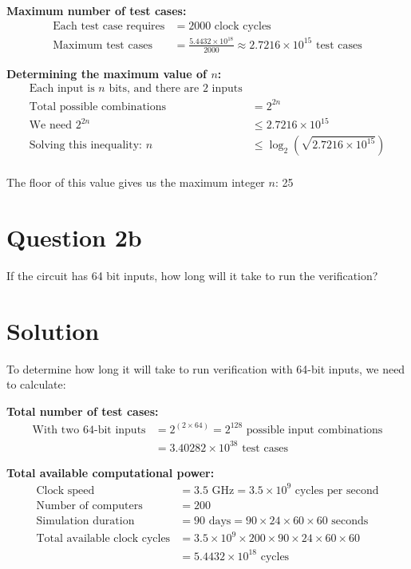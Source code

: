 \documentclass{article}
\begin{document}
\textbf{Maximum number of test cases:}
\begin{align*}
\text{Each test case requires} &= 2000 \text{ clock cycles} \\
\text{Maximum test cases} &= \frac{5.4432 \times 10^{18}}{2000} \approx 2.7216 \times 10^{15} \text{ test cases}
\end{align*}

\textbf{Determining the maximum value of $n$:}
\begin{align*}
\text{Each input is $n$ bits, and there are 2 inputs} \\
\text{Total possible combinations} &= 2^{2n} \\
\text{We need } 2^{2n} &\leq 2.7216 \times 10^{15} \\
\text{Solving this inequality: } n &\leq \log_2(\sqrt{2.7216 \times 10^{15}}) \\
\end{align*}

The floor of this value gives us the maximum integer $n$: 25

\section*{Question 2b}

If the circuit has 64 bit inputs, how long will it take to run the verification?

\section*{Solution}

To determine how long it will take to run verification with 64-bit inputs, we need to calculate:

\textbf{Total number of test cases:}
\begin{align*}
\text{With two 64-bit inputs} &= 2^{(2 \times 64)} = 2^{128} \text{ possible input combinations} \\
&= 3.40282 \times 10^{38} \text{ test cases}
\end{align*}

\textbf{Total available computational power:}
\begin{align*}
\text{Clock speed} &= 3.5 \text{ GHz} = 3.5 \times 10^9 \text{ cycles per second} \\
\text{Number of computers} &= 200 \\
\text{Simulation duration} &= 90 \text{ days} = 90 \times 24 \times 60 \times 60 \text{ seconds} \\
\text{Total available clock cycles} &= 3.5 \times 10^9 \times 200 \times 90 \times 24 \times 60 \times 60 \\
&= 5.4432 \times 10^{18} \text{ cycles}
\end{align*}
\end{document}
